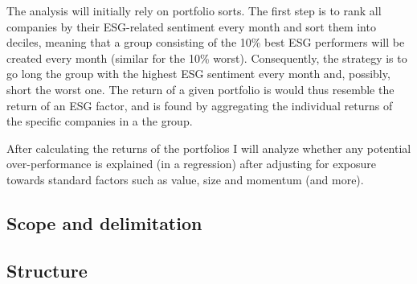 The analysis will initially rely on portfolio sorts. The first step is to rank all companies by their ESG-related sentiment every month and sort them into deciles, meaning that a group consisting of the 10\% best ESG performers will be created every month (similar for the 10\% worst). Consequently, the strategy is to go long the group with the highest ESG sentiment every month and, possibly, short the worst one. The return of a given portfolio is would thus resemble the return of an ESG factor, and is found by aggregating the individual returns of the specific companies in a the group.  

After calculating the returns of the portfolios I will analyze whether any potential over-performance is explained (in a regression) after adjusting for exposure towards standard factors such as value, size and momentum (and more).
\subsection{Scope and delimitation}

\subsection{Structure}
